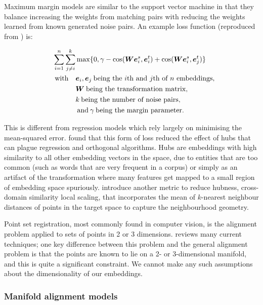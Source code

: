 Maximum margin models are similar to the support vector machine \cite{SVM} in that they balance increasing the weights from matching pairs with reducing the weights learned from known generated noise pairs. An example loss function (reproduced from \cite{kalinowski2020survey}) is:

\begin{equation*}
\begin{split}
\sum_{i=1}^n \sum_{j \neq i}^{k} &\max \{0, \gamma - \cos(\boldsymbol{W} \boldsymbol{e}_i^s, \boldsymbol{e}_i^t) + \cos(\boldsymbol{W} \boldsymbol{e}_i^s, \boldsymbol{e}_j^t)\}\\
\quad \text{with} \quad& \boldsymbol{e}_i, \boldsymbol{e}_j \medspace \text{being the $i$th and $j$th of $n$ embeddings},\\
& \boldsymbol{W} \medspace \text{being the transformation matrix},\\
& k \medspace \text{being the number of noise pairs}, \\
& \medspace \text{and}\medspace \gamma \medspace \text{being the margin parameter}.
\end{split}
\end{equation*}

This is different from regression models which rely largely on minimising the mean-squared error. \cite{Hubness} found that this form of loss reduced the effect of hubs that can plague regression and orthogonal algorithms. Hubs are embeddings with high similarity to all other embedding vectors in the space, due to entities that are too common (such as words that are very frequent in a corpus) or simply as an artifact of the transformation where many features get mapped to a small region of embedding space spuriously. \cite{ImprovingSupervisedBilingualMapping} introduce another metric to reduce hubness, cross-domain similarity local scaling, that incorporates the mean of $k$-nearest neighbour distances of points in the target space to capture the neighbourhood geometry. 

Point set registration, most commonly found in computer vision, is the alignment problem applied to sets of points in 2 or 3 dimensions. \cite{PointSetRegistrationReview} reviews many current techniques; one key difference between this problem and the general alignment problem is that the points are known to lie on a 2- or 3-dimensional manifold, and this is quite a significant constraint. We cannot make any such assumptions about the dimensionality of our embeddings. 

\subsubsection{Manifold alignment models}


